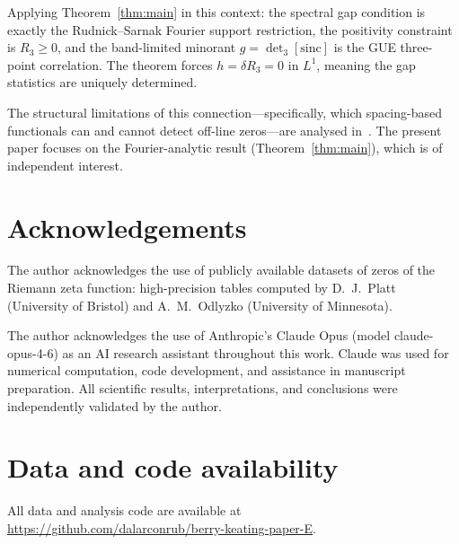 \documentclass[11pt]{article}
\begin{document}
Applying Theorem~\ref{thm:main} in this context: the spectral gap
condition is exactly the Rudnick--Sarnak Fourier support restriction,
the positivity constraint is $R_3 \geq 0$, and the band-limited
minorant $g = \det_3[\mathrm{sinc}]$ is the GUE three-point
correlation. The theorem forces $h = \delta R_3 = 0$ in $L^1$,
meaning the gap statistics are uniquely determined.

The structural limitations of this connection---specifically,
which spacing-based functionals can and cannot detect off-line
zeros---are analysed in~\cite{alarcon2026d}.
The present paper focuses on the Fourier-analytic result
(Theorem~\ref{thm:main}), which is of independent interest.


\section*{Acknowledgements}

The author acknowledges the use of publicly available datasets of zeros
of the Riemann zeta function: high-precision tables computed by
D.~J.~Platt (University of Bristol) and A.~M.~Odlyzko (University
of Minnesota).

The author acknowledges the use of Anthropic's Claude Opus
(model claude-opus-4-6) as an AI research assistant throughout this work.
Claude was used for numerical computation, code development, and
assistance in manuscript preparation. All scientific results,
interpretations, and conclusions were independently validated by the author.


\section*{Data and code availability}

All data and analysis code are available at
\url{https://github.com/dalarconrub/berry-keating-paper-E}.




\end{document}
